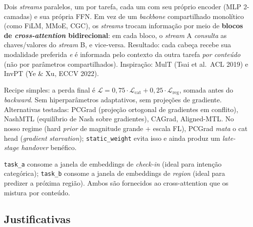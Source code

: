 \documentclass[11pt,a4paper]{article}
\begin{document}
\begin{description}[leftmargin=1em,style=nextline,topsep=0pt,itemsep=2pt]

\item[\texttt{mtlnet\_crossattn} (arquitetura).] Dois \textit{streams} paralelos, um por tarefa, cada um com seu próprio encoder (MLP 2-camadas) e sua própria FFN. Em vez de um \textit{backbone} compartilhado monolítico (como FiLM, MMoE, CGC), os \textit{streams} trocam informação por meio de \textbf{blocos de \textit{cross-attention} bidirecional}: em cada bloco, o \textit{stream} A \emph{consulta} as chaves/valores do \textit{stream} B, e vice-versa. Resultado: cada cabeça recebe sua modalidade preferida \emph{e} é informada pelo contexto da outra tarefa \emph{por conteúdo} (não por parâmetros compartilhados). Inspiração: MulT (Tsai et al.\ ACL 2019) e InvPT (Ye \& Xu, ECCV 2022).

\item[\texttt{static\_weight(cat=0{,}75)} (otimizador MTL).] Recipe simples: a perda final é $\mathcal{L} = 0{,}75 \cdot \mathcal{L}_\text{cat} + 0{,}25 \cdot \mathcal{L}_\text{reg}$, somada antes do \textit{backward}. Sem hiperparâmetros adaptativos, sem projeções de gradiente. Alternativas testadas: PCGrad (projeção ortogonal de gradientes em conflito), NashMTL (equilíbrio de Nash sobre gradientes), CAGrad, Aligned-MTL. No nosso regime (hard \textit{prior} de magnitude grande + escala FL), PCGrad \emph{mata} o cat head (\textit{gradient starvation}); \texttt{static\_weight} evita isso e ainda produz um \textit{late-stage handover} benéfico.

\item[Per-task input modality.] \texttt{task\_a} consome a janela de embeddings de \emph{check-in} (ideal para intenção categórica); \texttt{task\_b} consome a janela de embeddings de \emph{region} (ideal para predizer a próxima região). Ambos são fornecidos ao cross-attention que os mistura por conteúdo.

\end{description}

\subsection*{Justificativas}
\end{document}
